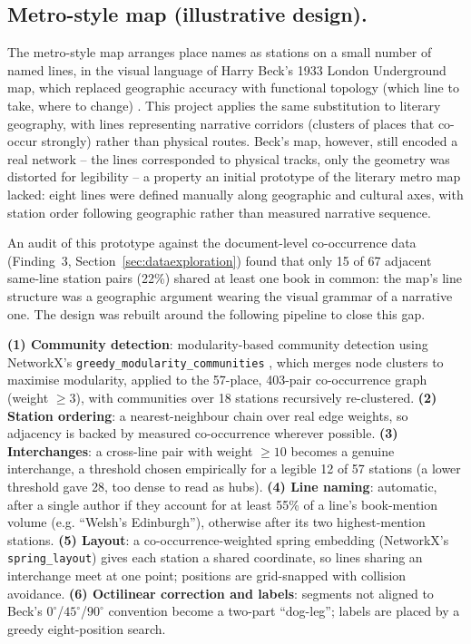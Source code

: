 \documentclass[logo,msc]{infthesis}
\begin{document}
\subsection{Metro-style map (illustrative design).} The metro-style map arranges place names as stations on a small number of named lines, in the visual language of Harry Beck's 1933 London Underground map, which replaced geographic accuracy with functional topology (which line to take, where to change) \cite{beck1933}. This project applies the same substitution to literary geography, with lines representing narrative corridors (clusters of places that co-occur strongly) rather than physical routes. Beck's map, however, still encoded a real network -- the lines corresponded to physical tracks, only the geometry was distorted for legibility -- a property an initial prototype of the literary metro map lacked: eight lines were defined manually along geographic and cultural axes, with station order following geographic rather than measured narrative sequence.

An audit of this prototype against the document-level co-occurrence data (Finding~3, Section~\ref{sec:dataexploration}) found that only 15 of 67 adjacent same-line station pairs (22\%) shared at least one book in common: the map's line structure was a geographic argument wearing the visual grammar of a narrative one. The design was rebuilt around the following pipeline to close this gap.

\textbf{(1) Community detection}: modularity-based community detection using NetworkX's \texttt{greedy\_modularity\_communities} \cite{hagberg2008}, which merges node clusters to maximise modularity, applied to the 57-place, 403-pair co-occurrence graph (weight $\geq 3$), with communities over 18 stations recursively re-clustered. \textbf{(2) Station ordering}: a nearest-neighbour chain over real edge weights, so adjacency is backed by measured co-occurrence wherever possible. \textbf{(3) Interchanges}: a cross-line pair with weight $\geq 10$ becomes a genuine interchange, a threshold chosen empirically for a legible 12 of 57 stations (a lower threshold gave 28, too dense to read as hubs). \textbf{(4) Line naming}: automatic, after a single author if they account for at least 55\% of a line's book-mention volume (e.g. ``Welsh's Edinburgh''), otherwise after its two highest-mention stations. \textbf{(5) Layout}: a co-occurrence-weighted spring embedding (NetworkX's \texttt{spring\_layout}) gives each station a shared coordinate, so lines sharing an interchange meet at one point; positions are grid-snapped with collision avoidance. \textbf{(6) Octilinear correction and labels}: segments not aligned to Beck's $0^\circ$/$45^\circ$/$90^\circ$ convention become a two-part ``dog-leg''; labels are placed by a greedy eight-position search.
\end{document}

